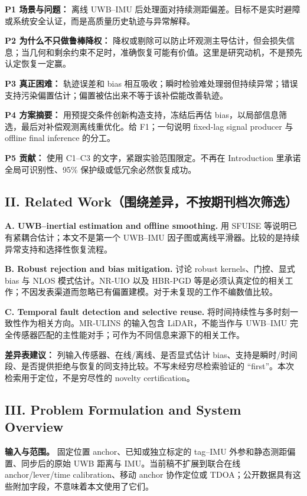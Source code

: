 \documentclass[UTF8,fontset=fandol,11pt,a4paper]{ctexart}
\begin{document}
\textbf{P1 场景与问题：} 离线 UWB--IMU 后处理面对持续测距偏差。目标不是实时避障或系统安全认证，而是高质量历史轨迹与异常解释。

\textbf{P2 为什么不只做鲁棒降权：} 降权或剔除可以防止坏观测主导估计，但会损失信息；当几何和剩余约束不足时，准确恢复可能有价值。这里是研究动机，不是预先认定恢复一定赢。

\textbf{P3 真正困难：} 轨迹误差和 bias 相互吸收；瞬时检验难处理弱但持续异常；错误支持污染偏置估计；偏置被估出来不等于该补偿能改善轨迹。

\textbf{P4 方案摘要：} 用预提交条件创新构造支持，冻结后再估 bias，以局部信息筛选，最后对补偿观测离线重优化。给 F1；一句说明 fixed-lag signal producer 与 offline final inference 的分工。

\textbf{P5 贡献：} 使用 C1--C3 的文字，紧跟实验范围限定。不再在 Introduction 里承诺全局可识别性、95\% 保护级或低冗余必然恢复成功。

\subsection{II. Related Work（围绕差异，不按期刊档次筛选）}

\textbf{A. UWB--inertial estimation and offline smoothing.} 用 SFUISE 等说明已有紧耦合估计；本文不是第一个 UWB--IMU 因子图或离线平滑器。比较的是持续异常支持和选择性恢复流程。\cite{sfuise}

\textbf{B. Robust rejection and bias mitigation.} 讨论 robust kernels、门控、显式 bias 与 NLOS 模式估计。NR-UIO 以及 HBR-PGD 等是必须认真定位的相关工作；不因发表渠道而忽略已有偏置建模。对于未复现的工作不编数值比较。\cite{nruio,hbr}

\textbf{C. Temporal fault detection and selective reuse.} 将时间持续性与多时刻一致性作为相关方向。MR-ULINS 的输入包含 LiDAR，不能当作与 UWB--IMU 完全传感器匹配的主性能对手；可作为不同信息来源下的相关工作。\cite{mrulins}

\textbf{差异表建议：} 列输入传感器、在线/离线、是否显式估计 bias、支持是瞬时/时间段、是否提供拒绝与恢复的同支持比较。不写未经穷尽检索验证的 ``first''。本次检索用于定位，不是穷尽性的 novelty certification。

\subsection{III. Problem Formulation and System Overview}

\textbf{输入与范围。} 固定位置 anchor、已知或独立标定的 tag--IMU 外参和静态测距偏置、同步后的原始 UWB 距离与 IMU。当前稿不扩展到联合在线 anchor/lever/time calibration、移动 anchor 协作定位或 TDOA；公开数据具有这些附加字段，不意味着本文使用了它们。
\end{document}
